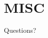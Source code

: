 \documentclass{beamer}
\newcommand{\weib}{\CJKfamily{weib}}
\begin{document}


\section{MISC}
\begin{frame}
	\begin{center}
    \LARGE{Questions?}
	\end{center}
\end{frame}
\end{document}
